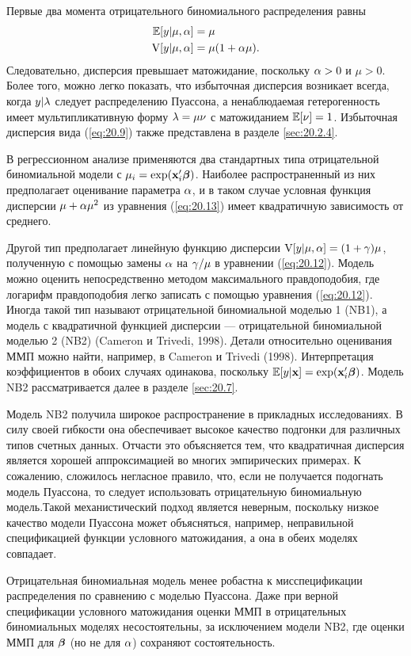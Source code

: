 Первые два момента отрицательного биномиального распределения равны
    \begin{align}\label{eq:20.13}
    \mathbb{E}[y|\mu, \alpha] &= \mu \\
    \mathrm{V}[y|\mu, \alpha] &= \mu(1 + \alpha\mu). \notag
    \end{align}
Следовательно, дисперсия превышает матожидание, поскольку $\alpha > 0$ и $\mu > 0$. Более того, можно легко показать, что избыточная дисперсия возникает всегда, когда $y|\lambda$ следует распределению Пуассона, а ненаблюдаемая гетерогенность имеет мультипликативную форму $\lambda = \mu\nu$ с матожиданием $\mathbb{E}[\nu] = 1$. Избыточная дисперсия вида (\ref{eq:20.9}) также представлена в разделе \ref{sec:20.2.4}.

В регрессионном анализе применяются два стандартных типа отрицательной биномиальной модели с $\mu_i = \exp(\mathbf{x}_i'\bm{\beta})$.
Наиболее распространенный из них предполагает оценивание параметра $\alpha$, и в таком случае условная функция дисперсии $\mu + \alpha \mu ^2$ из уравнения (\ref{eq:20.13}) имеет квадратичную зависимость от среднего.

Другой тип предполагает линейную функцию дисперсии $\mathrm{V}[y|\mu, \alpha] = (1 + \gamma)\mu$, полученную с помощью замены $\alpha$ на $\gamma/\mu$ в уравнении (\ref{eq:20.12}). Модель можно оценить непосредственно методом максимального правдоподобия, где логарифм правдоподобия легко записать с помощью уравнения (\ref{eq:20.12}). Иногда такой тип называют отрицательной биномиальной моделью 1 (NB1), а модель с квадратичной функцией дисперсии --- отрицательной биномиальной моделью 2 (NB2) (Cameron и Trivedi, 1998). Детали относительно оценивания ММП можно найти, например, в Cameron и Trivedi (1998). Интерпретация коэффициентов в обоих случаях одинакова, поскольку $\mathbb{E}[y|\mathbf{x}] = \exp(\mathbf{x}_i'\bm{\beta})$. Модель NB2 рассматривается далее в разделе \ref{sec:20.7}.

Модель NB2 получила широкое распространение в прикладных исследованиях. В силу своей гибкости она обеспечивает высокое качество подгонки для различных типов счетных данных. Отчасти это объясняется тем, что квадратичная дисперсия является хорошей аппроксимацией во многих эмпирических примерах. К сожалению, сложилось негласное правило, что, если не получается подогнать модель Пуассона, то следует использовать отрицательную биномиальную модель.Такой механистический подход является неверным, поскольку низкое качество модели Пуассона может объясняться, например, неправильной спецификацией функции условного матожидания, а она в обеих моделях совпадает.

Отрицательная биномиальная модель менее робастна к мисспецификации распределения по сравнению с моделью Пуассона. Даже при верной спецификации условного матожидания оценки ММП в отрицательных биномиальных моделях несостоятельны, за исключением модели NB2, где оценки ММП для $\bm{\beta}$ (но не для $\alpha$) сохраняют состоятельность.

